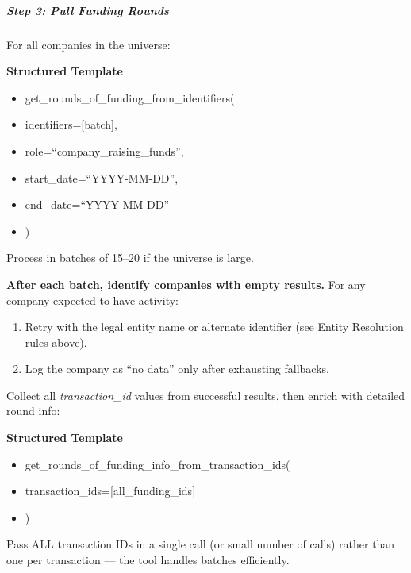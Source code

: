 \documentclass[11pt]{article}
\begin{document}
\subparagraph{Step 3: Pull Funding Rounds}\mbox{}\par

For all companies in the universe:


\textbf{Structured Template}
\begin{itemize}[leftmargin=*,itemsep=2pt,topsep=2pt]
\item {} get\_\allowbreak{}rounds\_\allowbreak{}of\_\allowbreak{}funding\_\allowbreak{}from\_\allowbreak{}identifiers(
\item {} identifiers=[batch],
\item {} role=``company\_\allowbreak{}raising\_\allowbreak{}funds'',
\item {} start\_\allowbreak{}date=``YYYY-MM-DD'',
\item {} end\_\allowbreak{}date=``YYYY-MM-DD''
\item {} )
\end{itemize}

Process in batches of 15–20 if the universe is large.


\textbf{After each batch, identify companies with empty results.} For any company expected to have activity:

\begin{enumerate}[leftmargin=*,itemsep=2pt,topsep=2pt]
\item {} Retry with the legal entity name or alternate identifier (see Entity Resolution rules above).
\item {} Log the company as ``no data'' only after exhausting fallbacks.
\end{enumerate}

Collect all \emph{transaction\_\allowbreak{}id} values from successful results, then enrich with detailed round info:


\textbf{Structured Template}
\begin{itemize}[leftmargin=*,itemsep=2pt,topsep=2pt]
\item {} get\_\allowbreak{}rounds\_\allowbreak{}of\_\allowbreak{}funding\_\allowbreak{}info\_\allowbreak{}from\_\allowbreak{}transaction\_\allowbreak{}ids(
\item {} transaction\_\allowbreak{}ids=[all\_\allowbreak{}funding\_\allowbreak{}ids]
\item {} )
\end{itemize}

Pass ALL transaction IDs in a single call (or small number of calls) rather than one per transaction — the tool handles batches efficiently.
\end{document}
